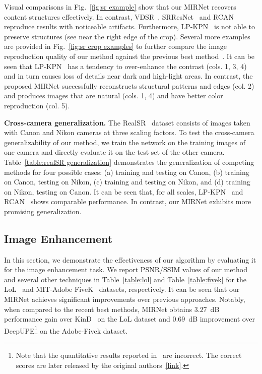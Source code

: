 \documentclass[runningheads]{llncs}
\begin{document}
Visual comparisons in Fig.~\ref{fig:sr example} show that our MIRNet recovers content structures effectively. In contrast, VDSR~\cite{VDSR}, SRResNet~\cite{SRResNet} and RCAN~\cite{RCAN} reproduce results with noticeable artifacts. 
Furthermore, LP-KPN~\cite{RealSR} is not able to preserve structures (see near the right edge of the crop). 
Several more examples are provided in Fig.~\ref{fig:sr crop examples} to further compare the image reproduction quality of our method against the previous best method~\cite{RealSR}.  
It can be seen that LP-KPN~\cite{RealSR} has a tendency to over-enhance the contrast (cols. 1, 3, 4) and in turn causes loss of details near dark and high-light areas.
In contrast, the proposed MIRNet successfully reconstructs structural patterns and edges (col. 2) and produces images that are natural (cols. 1, 4) and have better color reproduction (col. 5). 

\vspace{0.4em}\noindent\textbf{Cross-camera generalization.} The RealSR~\cite{RealSR} dataset consists of images taken with Canon and Nikon cameras at three scaling factors. To test the cross-camera generalizability of our method, we train the network on the training images of one camera and directly evaluate it on the test set of the other camera. Table~\ref{table:realSR generalization} demonstrates the generalization of  competing methods for four possible cases: (a) training and testing on Canon, (b) training on Canon, testing on Nikon, (c) training and testing on Nikon, and (d) training on Nikon, testing on Canon. It can be seen that, for all scales, LP-KPN~\cite{RealSR} and RCAN~\cite{RCAN} shows comparable performance. 
In contrast, our MIRNet exhibits more promising generalization. 








\subsection{Image Enhancement}

In this section, we demonstrate the effectiveness of our algorithm by evaluating it for the image enhancement task. 
We report PSNR/SSIM values of our method and several other techniques in Table~\ref{table:lol} and Table~\ref{table:fivek} for the LoL~\cite{wei2018deep} and MIT-Adobe FiveK~\cite{mit_fivek} datasets, respectively. 
It can be seen that our MIRNet achieves significant improvements over previous approaches. 
Notably, when compared to the recent best methods, MIRNet obtains $3.27$~dB performance gain over KinD~\cite{zhang2019kindling} on the LoL dataset and $0.69$~dB improvement over DeepUPE\footnote{Note that the quantitative results reported in~\cite{wang2019underexposed} are incorrect. The correct scores are later released by the original authors~\href{https://drive.google.com/file/d/1fJ7MQfm6NuCMtfQzLM0Y6LNU9XyQb6Ho/view}{[link]}.} \cite{wang2019underexposed} on the Adobe-Fivek dataset.  
\end{document}
